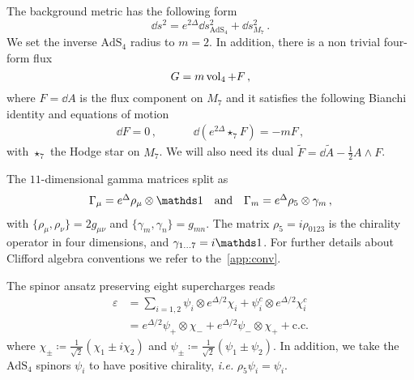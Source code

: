 \documentclass[debug]{phd}
\begin{document}
The background metric has the following form 
%
	\begin{equation}
	\label{eq:metric_mtheory_ads4}
		\dd  s^2 = e^{2\Delta} \dd  s^2_{\mathrm{AdS}_4} + \dd  s^2_{M_7} \, .
	\end{equation}
%
We set the inverse $\mathrm{AdS}_4$ radius to $m=2$. In addition, there is a non trivial four-form flux 
%
	\begin{equation}
		G = m \operatorname{vol}_4 + F \, ,
	\end{equation}
%
where $F = \dd  A$ is the flux component on $M_7$ and it satisfies the following Bianchi identity and equations of motion 
%
	\begin{equation}
		\begin{array}{ccccc}
			\dd  F = 0\, , & & & &\dd ( e^{2\Delta} \star_7 F ) = - m F \, , 
	\end{array}
	\end{equation}
%
with $\star_7$ the Hodge star on $M_7$. 
We will also need its dual $\tilde{F} = \dd  \tilde{A} - \tfrac{1}{2} A \wedge F$. 

%
%
%
%
	
The $11$-dimensional gamma matrices split as 
%
	\begin{equation}
	\label{eq:dec_gammas_m7}
		\begin{array}{ccc}
			\Gamma_{\mu} = e^{\Delta} \rho_{\mu} \otimes \id & \mbox{and} & \Gamma_m = e^{\Delta} \rho_5 \otimes \gamma_m\, ,
		\end{array}
	\end{equation}
%
with $\{\rho_{\mu}, \rho_{\nu}\}=2 g_{\mu \nu}$ and $\{\gamma_m, \gamma_n\}= g_{mn}$. 
The matrix $\rho_5 = i \rho_{0123}$ is the chirality operator in four dimensions, and $\gamma_{1 \ldots 7}=i \id$.
For further details about Clifford algebra conventions we refer to the~\cref{app:conv}.

The spinor ansatz preserving eight supercharges reads~\cite{Gabella:2012rc, Gabella:2011sg}
%
	\begin{equation}
	\label{eq:spinor_m7}
		\begin{split}
			\varepsilon &= \sum_{i=1,2} \psi_i \otimes e^{\Delta/2} \chi_i + \psi^c_i \otimes e^{\Delta/2} \chi_i^c\\
					&= e^{\Delta/2} \psi_+ \otimes \chi_- + e^{\Delta/2} \psi_- \otimes \chi_+ + \mathrm{c.c.} 
		\end{split}
	\end{equation}
%
where $\chi_{\pm} \coloneqq \tfrac{1}{\sqrt{2}} \left( \chi_1 \pm i \chi_2\right)$ and $\psi_{\pm} \coloneqq \tfrac{1}{\sqrt{2}} \left( \psi_1 \pm \psi_2\right)$. 
In addition, we take the $\mathrm{AdS}_4$ spinors $\psi_i$ to have positive chirality, \emph{i.e.} $\rho_5 \psi_i = \psi_i$.\\
\end{document}
